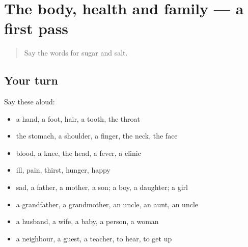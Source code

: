 \section[(dialogue)]{The body, health and family — a first pass}

\label{lesson:MR-R86-first-pass-the-body-health-and-family}



\begin{quote}
Say the words for sugar and salt.
\end{quote}

\subsection*{Your turn}
Say these aloud:

\begin{itemize}
\raggedright
  \item a hand, a foot, hair, a tooth, the throat
  \item the stomach, a shoulder, a finger, the neck, the face
  \item blood, a knee, the head, a fever, a clinic
  \item ill, pain, thirst, hunger, happy
  \item sad, a father, a mother, a son; a boy, a daughter; a girl
  \item a grandfather, a grandmother, an uncle, an aunt, an uncle
  \item a husband, a wife, a baby, a person, a woman
  \item a neighbour, a guest, a teacher, to hear, to get up
\end{itemize}

